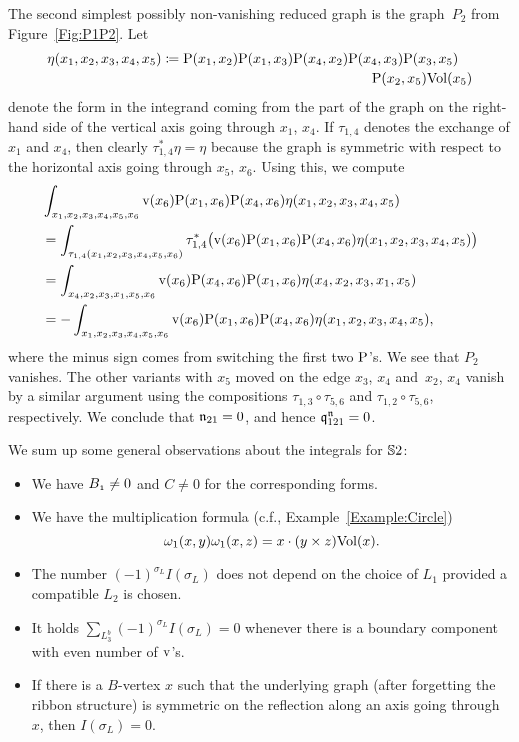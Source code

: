 \documentclass[\MainFolder/Text.tex]{subfiles}
\begin{document}
\begin{Remark}
The second simplest possibly non-vanishing reduced graph is the graph~$P_2$ from Figure~\ref{Fig:P1P2}. Let 
\begin{equation*}
\eta(x_1,x_2,x_3,x_4,x_5) \coloneqq\begin{multlined}[t]\Prpg(x_1,x_2)\Prpg(x_1,x_3)\Prpg(x_4,x_2)\Prpg(x_4,x_3)\Prpg(x_3,x_5)\\ \Prpg(x_2,x_5)\Vol(x_5) \end{multlined}
\end{equation*}
denote the form in the integrand coming from the part of the graph on the right-hand side of the vertical axis going through $x_1$, $x_4$. If $\tau_{1,4}$ denotes the exchange of $x_1$ and $x_4$, then clearly $\tau_{1,4}^* \eta = \eta$ because the graph is symmetric with respect to the horizontal axis going through $x_5$, $x_6$. Using this, we compute
\begin{align*}
& \int_{x_1,x_2,x_3,x_4,x_5,x_6} \mathrm{v}(x_6)\mathrm{P}(x_1,x_6)\mathrm{P}(x_4,x_6) \eta(x_1,x_2,x_3,x_4,x_5) \\
& = \int_{\tau_{1,4}(x_1,x_2,x_3,x_4,x_5,x_6)} \tau_{1,4}^*\bigl(\mathrm{v}(x_6)\mathrm{P}(x_1,x_6)\mathrm{P}(x_4,x_6) \eta(x_1,x_2,x_3,x_4,x_5)\bigr) \\
& = \int_{x_4,x_2,x_3,x_1,x_5,x_6} \mathrm{v}(x_6)\mathrm{P}(x_4,x_6)\mathrm{P}(x_1,x_6) \eta(x_4,x_2,x_3,x_1,x_5)\\
& = 
 -\int_{x_1,x_2,x_3,x_4,x_5,x_6} \mathrm{v}(x_6)\mathrm{P}(x_1,x_6)\mathrm{P}(x_4,x_6)  \eta(x_1,x_2,x_3,x_4,x_5),
\end{align*}
where the minus sign comes from switching the first two $\mathrm{P}$'s. We see that $P_2$ vanishes. The other variants with $x_5$ moved on the edge $x_3$, $x_4$ and~$x_2$, $x_4$ vanish by a similar argument using the compositions $\tau_{1,3}\circ\tau_{5,6}$ and $\tau_{1,2}\circ\tau_{5,6}$, respectively. We conclude that $\mathfrak{n}_{21} = 0$, and hence $\mathfrak{q}_{121}^{\mathfrak{n}} = 0$. 

We sum up some general observations about the integrals for $\mathbb{S}{2}$:

\begin{itemize}
\item We have $B_{\NOne} \neq 0$ and $C \neq 0$ for the corresponding forms.
\item We have the multiplication formula (c.f., Example~\ref{Example:Circle})
$$ \omega_1(x,y) \omega_1(x,z) = x\cdot(y\times z) \mathrm{Vol}(x). $$
\item The number $(-1)^{\sigma_L} I(\sigma_L)$ does not depend on the choice of $L_1$ provided a compatible $L_2$ is chosen.
\item It holds $\sum_{L_3^b} (-1)^{\sigma_L} I(\sigma_L) = 0$ whenever there is a boundary component with even number of $\mathrm{v}$'s.
\item If there is a $B$-vertex $x$ such that the underlying graph (after forgetting the ribbon structure) is symmetric on the reflection along an axis going through $x$, then $I(\sigma_L) = 0$. \qedhere
\end{itemize}


\end{Remark}
\end{document}
